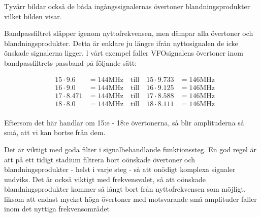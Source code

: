 Tyvärr bildar också de båda ingångssignalernas övertoner
blandningsprodukter vilket bilden visar.

Bandpassfiltret släpper igenom nyttofrekvensen, men dämpar alla
övertoner och blandningsprodukter. Detta är enklare ju längre ifrån
nyttosignalen de icke önskade signalerna ligger. l vårt exempel faller
VFOsignalens övertoner inom bandpassfiltrets passband på följande
sätt:

\begin{align*}
  &15 \cdot 9.6   &= 144 \text{MHz} \quad \text{till} \quad 15 \cdot 9.733 &= 146 \text{MHz} \\
  &16 \cdot 9.0   &= 144 \text{MHz} \quad \text{till} \quad 16 \cdot 9.125 &= 146 \text{MHz} \\
  &17 \cdot 8.471 &= 144 \text{MHz} \quad \text{till} \quad 17 \cdot 8.588 &= 146 \text{MHz} \\
  &18 \cdot 8.0   &= 144 \text{MHz} \quad \text{till} \quad 18 \cdot 8.111 &= 146 \text{MHz} \\
\end{align*}


Eftersom det här handlar om 15:e - 18:e övertonerna, så blir
amplituderna så små, att vi kan bortse från dem.

Det är viktigt med goda filter i signalbehandlande funktionssteg. En
god regel är att på ett tidigt stadium filtrera bort oönskade
övertoner och blandningsprodukter - helst i varje steg - så att
onödigt komplexa signaler undviks. Det är också viktigt med
frekvensvalet, så att oönskade blandningsprodukter kommer så långt
bort från nyttofrekvensen som möjligt, liksom att endast mycket höga
övertoner med motsvarande små amplituder faller inom det nyttiga
frekvensområdet
